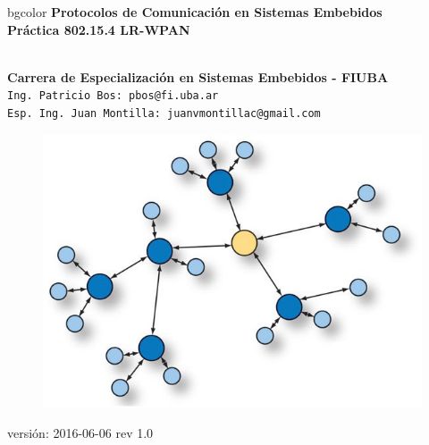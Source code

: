 \documentclass[aspectratio=169, handout]{beamer}
\begin{document}
\begingroup
\makeatletter
\setlength{\hoffset}{-.5\beamer@sidebarwidth}
\makeatother
\begin{frame}
\begin{center}
\hfill
    \begin{beamercolorbox}[center,dp=3ex,ht=10.25ex, wd=1\linewidth]{bgcolor}
        \Large\textbf{Protocolos de Comunicación en Sistemas Embebidos}\\
        \huge\textbf{Práctica 802.15.4 LR-WPAN}
    \end{beamercolorbox}
\hfill\hfill
\\
\vspace{5px}
\textbf{Carrera de Especialización en Sistemas Embebidos - FIUBA}\\
\vspace{10px}
\texttt{Ing. Patricio Bos: pbos@fi.uba.ar}\\
\texttt{Esp. Ing. Juan Montilla: juanvmontillac@gmail.com}\\

\vspace{10px}

\begin{figure}[H]
	\includegraphics[width=.3\textwidth]{./imagenes/red.jpg}
\end{figure}	

\vspace{5px}
\tiny versión: 2016-06-06 rev 1.0 
 	  	
\end{center}
\end{frame}
\endgroup
\end{document}
